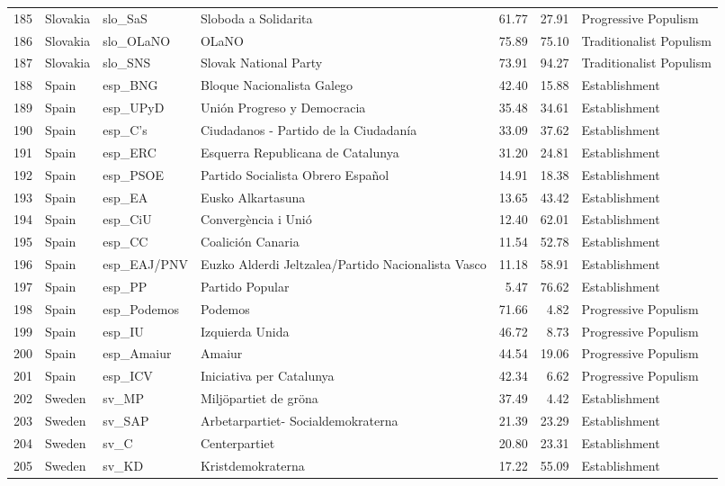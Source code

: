 \begin{longtable}[c]{@{\extracolsep{\fill}}rlllrrl}
		185 & Slovakia & slo\_SaS & Sloboda a Solidarita & 61.77 & 27.91 & Progressive Populism \\
		186 & Slovakia & slo\_OLaNO & OLaNO & 75.89 & 75.10 & Traditionalist Populism \\
		187 & Slovakia & slo\_SNS & Slovak National Party & 73.91 & 94.27 & Traditionalist Populism \\
		188 & Spain & esp\_BNG & Bloque Nacionalista Galego & 42.40 & 15.88 & Establishment \\
		189 & Spain & esp\_UPyD & Unión Progreso y Democracia & 35.48 & 34.61 & Establishment \\
		190 & Spain & esp\_C's & Ciudadanos - Partido de la Ciudadanía & 33.09 & 37.62 & Establishment \\
		191 & Spain & esp\_ERC & Esquerra Republicana de Catalunya & 31.20 & 24.81 & Establishment \\
		192 & Spain & esp\_PSOE & Partido Socialista Obrero Español & 14.91 & 18.38 & Establishment \\
		193 & Spain & esp\_EA & Eusko Alkartasuna & 13.65 & 43.42 & Establishment \\
		194 & Spain & esp\_CiU & Convergència i Unió & 12.40 & 62.01 & Establishment \\
		195 & Spain & esp\_CC & Coalición Canaria & 11.54 & 52.78 & Establishment \\
		196 & Spain & esp\_EAJ/PNV & Euzko Alderdi Jeltzalea/Partido Nacionalista Vasco & 11.18 & 58.91 & Establishment \\
		197 & Spain & esp\_PP & Partido Popular & 5.47 & 76.62 & Establishment \\
		198 & Spain & esp\_Podemos & Podemos & 71.66 & 4.82 & Progressive Populism \\
		199 & Spain & esp\_IU & Izquierda Unida & 46.72 & 8.73 & Progressive Populism \\
		200 & Spain & esp\_Amaiur & Amaiur & 44.54 & 19.06 & Progressive Populism \\
		201 & Spain & esp\_ICV & Iniciativa per Catalunya & 42.34 & 6.62 & Progressive Populism \\
		202 & Sweden & sv\_MP & Miljöpartiet de gröna & 37.49 & 4.42 & Establishment \\
		203 & Sweden & sv\_SAP & Arbetarpartiet- Socialdemokraterna & 21.39 & 23.29 & Establishment \\
		204 & Sweden & sv\_C & Centerpartiet & 20.80 & 23.31 & Establishment \\
		205 & Sweden & sv\_KD & Kristdemokraterna & 17.22 & 55.09 & Establishment \\

\end{longtable}
